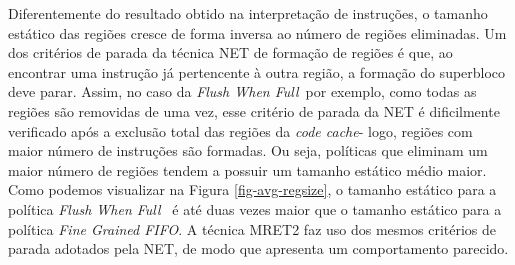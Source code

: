 \documentclass[12pt,twoside]{article}
\newcommand{\ccache}{\emph{code cache}}
\newcommand{\flush}{\emph{Flush When Full}}
\newcommand{\finefifo}{\emph{Fine Grained FIFO}}
\begin{document}
Diferentemente do resultado obtido na interpretação de instruções, o tamanho estático das regiões cresce de forma inversa ao número de regiões eliminadas. Um dos critérios de parada da técnica NET de formação de regiões é que, ao encontrar uma instrução já pertencente à outra região, a formação do superbloco deve parar. Assim, no caso da \flush~por exemplo, como todas as regiões são removidas de uma vez, esse critério de parada da NET é dificilmente verificado após a exclusão total das regiões da \ccache - logo, regiões com maior número de instruções são formadas. Ou seja, políticas que eliminam um maior número de regiões tendem a possuir um tamanho estático médio maior. Como podemos visualizar na Figura \ref{fig-avg-regsize}, o tamanho estático para a política \flush~ é até duas vezes maior que o tamanho estático para a política \finefifo. A técnica MRET2 faz uso dos mesmos critérios de parada adotados pela NET, de modo que apresenta um comportamento parecido.
\end{document}
